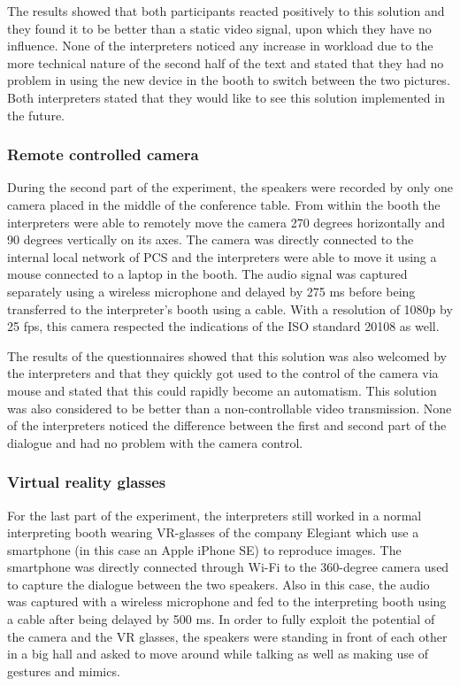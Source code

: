 \documentclass[output=paper]{langsci/langscibook}
\begin{document}
The results showed that both participants reacted positively to this solution and they found it to be better than a static video signal, upon which they have no influence. None of the interpreters noticed any increase in workload due to the more technical nature of the second half of the text and stated that they had no problem in using the new device in the booth to switch between the two pictures. Both interpreters stated that they would like to see this solution implemented in the future.

\subsubsection{Remote controlled camera}

During the second part of the experiment, the speakers were recorded by only one camera placed in the middle of the conference table. From within the booth the interpreters were able to remotely move the camera 270 degrees horizontally and 90 degrees vertically on its axes. The camera was directly connected to the internal local network of PCS and the interpreters were able to move it using a mouse connected to a laptop in the booth. The audio signal was captured separately using a wireless microphone and delayed by 275 ms before being transferred to the interpreter’s booth using a cable. With a resolution of 1080p by 25 fps, this camera respected the indications of the ISO standard 20108 as well. 

The results of the questionnaires showed that this solution was also welcomed by the interpreters and that they quickly got used to the control of the camera via mouse and stated that this could rapidly become an automatism. This solution was also considered to be better than a non-controllable video transmission. None of the interpreters noticed the difference between the first and second part of the dialogue and had no problem with the camera control.

\subsubsection{Virtual reality glasses}

For the last part of the experiment, the interpreters still worked in a normal interpreting booth wearing VR-glasses of the company Elegiant which use a smartphone (in this case an Apple iPhone SE) to reproduce images. The smartphone was directly connected through Wi-Fi to the 360-degree camera used to capture the dialogue between the two speakers. Also in this case, the audio was captured with a wireless microphone and fed to the interpreting booth using a cable after being delayed by 500 ms. In order to fully exploit the potential of the camera and the VR glasses, the speakers were standing in front of each other in a big hall and asked to move around while talking as well as making use of gestures and mimics.
\end{document}
